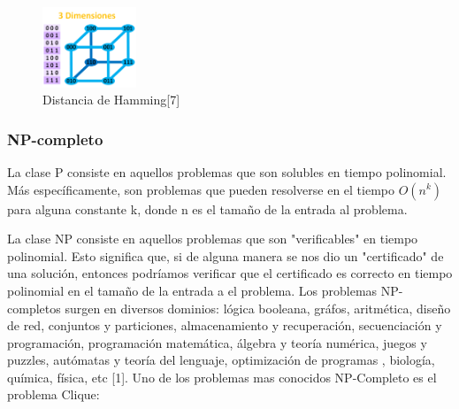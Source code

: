 \documentclass[conference,compsoc]{IEEEtran}
\begin{document}
\begin{figure}[h]
    \centering
    \includegraphics[width=0.25\textwidth]{Problema3/M4.png}
    \caption{Distancia de Hamming[7]}
    \label{fig:mesh1}
\end{figure}


\subsubsection{NP-completo}
La clase P consiste en aquellos problemas que son solubles en tiempo polinomial. Más específicamente, son problemas que pueden resolverse en el tiempo $O (n^{k})$ para alguna constante k, donde n es el tamaño de la entrada al problema.

La clase NP consiste en aquellos problemas que son "verificables" en tiempo polinomial. Esto significa que, si de alguna manera se nos dio un "certificado" de una solución, entonces podríamos verificar que el certificado es correcto en tiempo polinomial en el tamaño de la entrada a el problema.
Los problemas NP-completos surgen en diversos dominios: lógica booleana, gráfos, aritmética, diseño de red, conjuntos y particiones, almacenamiento y recuperación, secuenciación y programación, programación matemática, álgebra y teoría numérica, juegos y puzzles, autómatas y teoría del lenguaje, optimización de programas , biología, química, física, etc [1]. Uno de los problemas mas conocidos NP-Completo es el problema Clique:
\end{document}
